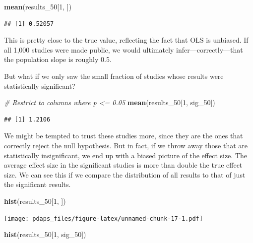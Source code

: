 \documentclass[12pt,oneside,openany]{book}
\newenvironment{Shaded}{\begin{snugshade}}{\end{snugshade}}
\newcommand{\KeywordTok}[1]{\textcolor[rgb]{0.13,0.29,0.53}{\textbf{{#1}}}}
\newcommand{\DecValTok}[1]{\textcolor[rgb]{0.00,0.00,0.81}{{#1}}}
\newcommand{\CommentTok}[1]{\textcolor[rgb]{0.56,0.35,0.01}{\textit{{#1}}}}
\newcommand{\NormalTok}[1]{{#1}}
\begin{document}
\begin{Shaded}
\begin{Highlighting}[]
\KeywordTok{mean}\NormalTok{(results_50[}\DecValTok{1}\NormalTok{, ])}
\end{Highlighting}
\end{Shaded}

\begin{verbatim}
## [1] 0.52057
\end{verbatim}

This is pretty close to the true value, reflecting the fact that OLS is
unbiased. If all 1,000 studies were made public, we would ultimately
infer---correctly---that the population slope is roughly 0.5.

But what if we only saw the small fraction of studies whose results were
statistically significant?

\begin{Shaded}
\begin{Highlighting}[]
\CommentTok{# Restrict to columns where p <= 0.05}
\KeywordTok{mean}\NormalTok{(results_50[}\DecValTok{1}\NormalTok{, sig_50])}
\end{Highlighting}
\end{Shaded}

\begin{verbatim}
## [1] 1.2106
\end{verbatim}

We might be tempted to trust these studies more, since they are the ones
that correctly reject the null hypothesis. But in fact, if we throw away
those that are statistically insignificant, we end up with a biased
picture of the effect size. The average effect size in the significant
studies is more than double the true effect size. We can see this if we
compare the distribution of all results to that of just the significant
results.

\begin{Shaded}
\begin{Highlighting}[]
\KeywordTok{hist}\NormalTok{(results_50[}\DecValTok{1}\NormalTok{, ])}
\end{Highlighting}
\end{Shaded}

\texttt{[image: pdaps\_files/figure-latex/unnamed-chunk-17-1.pdf]}

\begin{Shaded}
\begin{Highlighting}[]
\KeywordTok{hist}\NormalTok{(results_50[}\DecValTok{1}\NormalTok{, sig_50])}
\end{Highlighting}
\end{Shaded}
\end{document}
